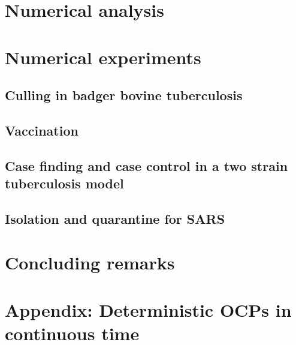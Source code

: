 \documentclass[11pt]{amsart}
\theoremstyle{definition}
\numberwithin{equation}{section}
\begin{document}
  \section{Numerical analysis}
    
    
  \section{Numerical experiments}
    \subsection{Culling in badger bovine tuberculosis}
      
    \subsection{Vaccination}
      
    \subsection{Case finding and case control 
      in a two strain tuberculosis model}
      
    \subsection{Isolation and quarantine for SARS} 
      
%
  \section{Concluding remarks}
   
  \section{Appendix: Deterministic OCPs in continuous time}
    
%
  
  
\end{document}
